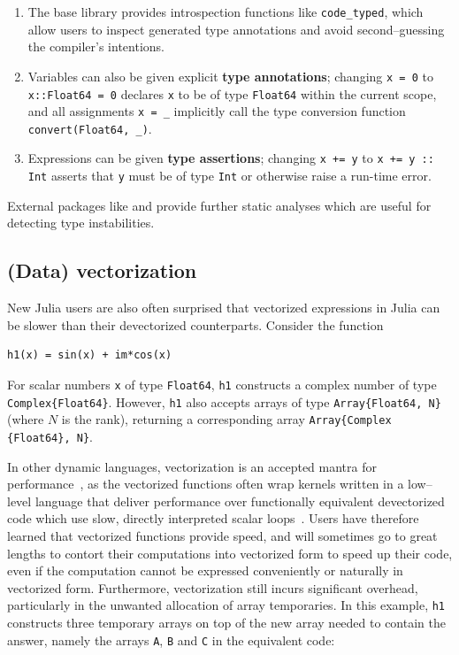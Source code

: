 \documentclass[pldi]{sigplanconf-pldi15}
\begin{document}
\begin{enumerate}

	\item The base library provides introspection functions like
	\verb|code_typed|, which allow users to inspect generated type
	annotations and avoid second--guessing the compiler's intentions.
		
	\item Variables can also be given explicit \textbf{type annotations};
	changing \verb|x = 0| to \verb|x::Float64 = 0| declares \verb|x| to be
	of type \verb|Float64| within the current scope, and all assignments
	\verb|x = _| implicitly call the type conversion function
	\verb|convert(Float64, _)|.

	\item Expressions can be given \textbf{type assertions}; changing
	\verb|x += y| to \verb|x += y :: Int| asserts that \verb|y| must be of
	type \verb|Int| or otherwise raise a run-time error.

\end{enumerate}
%
External packages like  and  provide
further static analyses which are useful for detecting type instabilities.


\subsection{(Data) vectorization}

New Julia users are also often surprised that vectorized expressions in Julia
can be slower than their devectorized counterparts. Consider the function

\begin{lstlisting}
h1(x) = sin(x) + im*cos(x)
\end{lstlisting}
%
For scalar numbers \verb|x| of type \verb|Float64|, \verb|h1| constructs a
complex number of type \verb|Complex{Float64}|. However, \verb|h1| also accepts
arrays of type \verb|Array{Float64, N}| (where $N$ is the rank), returning a
corresponding array \verb|Array{Complex| \verb|{Float64}, N}|.

In other dynamic languages, vectorization is an accepted mantra for
performance~\cite{matlabuserguide,Langtangen2008}, as the vectorized functions often wrap
kernels written in a low--level language that deliver performance over
functionally equivalent devectorized code which use slow, directly interpreted
scalar loops~\cite{Seljebotn2009,Walt2011}. Users have therefore learned that
vectorized functions provide speed, and will sometimes go to great lengths to
contort their computations into vectorized form to speed up their code, even if
the computation cannot be expressed conveniently or naturally in vectorized
form. Furthermore, vectorization still incurs significant overhead,
particularly in the unwanted allocation of array temporaries. In this example,
\verb|h1| constructs three temporary arrays on top of the new array needed to
contain the answer, namely the arrays \verb|A|, \verb|B| and \verb|C| in the
equivalent code: 
\end{document}
